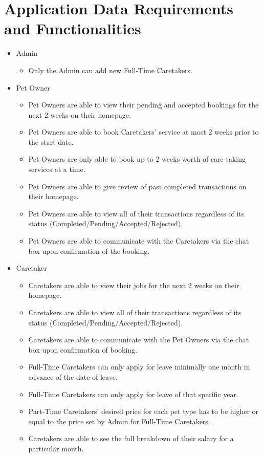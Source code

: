 \documentclass[10pt]{article}
\begin{document}
\section{Application Data Requirements and Functionalities}
\begin{itemize}
    \item Admin
    \begin{itemize}
        \item Only the Admin can add new Full-Time Caretakers.
    \end{itemize}
    
    \item Pet Owner
    \begin{itemize}
        \item Pet Owners are able to view their pending and accepted bookings for the next 2 weeks on their homepage.
        \item Pet Owners are able to book Caretakers' service at most 2 weeks prior to the start date.
        \item Pet Owners are only able to book up to 2 weeks worth of care-taking services at a time.
        \item Pet Owners are able to give review of past completed transactions on their homepage.
        \item Pet Owners are able to view all of their transactions regardless of its status \newline (Completed/Pending/Accepted/Rejected).
        \item Pet Owners are able to communicate with the Caretakers via the chat box upon confirmation of the booking.
    \end{itemize}
    
    \item Caretaker
    \begin{itemize}
        \item Caretakers are able to view their jobs for the next 2 weeks on their homepage.
        \item Caretakers are able to view all of their transactions regardless of its status \newline (Completed/Pending/Accepted/Rejected).
        \item Caretakers are able to communicate with the Pet Owners via the chat box upon confirmation of booking.
        \item Full-Time Caretakers can only apply for leave minimally one month in advance of the date of leave.
        \item Full-Time Caretakers can only apply for leave of that specific year.
        \item Part-Time Caretakers' desired price for each pet type has to be higher or equal to the price set by Admin for Full-Time Caretakers.
        \item Caretakers are able to see the full breakdown of their salary for a particular month.
    \end{itemize}
    

\end{itemize}
\end{document}
